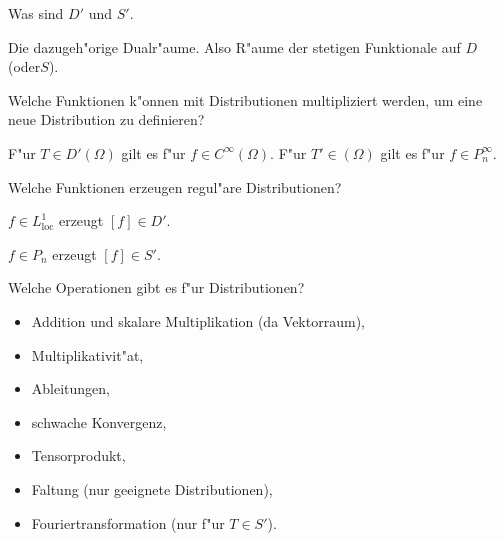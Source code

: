 \documentclass[9pt]{article}
\newenvironment{field}{}{\newpage}
\newif\ifnote
\newenvironment{note}{\notetrue}{\notefalse}
\newcommand{\localtag}{}
\newcommand{\globaltag}{}
\newcommand{\uuid}{}
\newcommand{\tags}[1]{
    \ifnote 
        \renewcommand{\localtag}{#1}
    \else
        \renewcommand{\globaltag}{#1}
    \fi 
    }
\newcommand{\xplain}[1]{\renewcommand{\uuid}{#1}}
\begin{document}
				\begin{note}
					\xplain{9d3022eb-bcb3-4ebd-9d9a-e47e352b6adc}
					\tags{}
					
					\begin{field}  %
						Was sind $D'$ und $S'$.
					\end{field}
					
					\begin{field}  %
						Die dazugeh"orige Dualr"aume. Also R"aume der stetigen Funktionale auf $D$ (oder$S$).
					\end{field}
						
					\begin{field}  %
						Welche Funktionen k"onnen mit Distributionen multipliziert werden, um eine
						neue Distribution zu definieren?
					\end{field}
					
					\begin{field}  %
						F"ur $T\in D'(\Omega)$ gilt es f"ur  $f\in C^\infty(\Omega)$.
						F"ur $T'\in (\Omega)$ gilt es f"ur  $f\in P^\infty_n$.
					\end{field}
						
					\begin{field}  %
						Welche Funktionen erzeugen regul"are Distributionen? 
					\end{field}
					
					\begin{field}  %
						$f\in L^1_{\text{loc}}$ erzeugt $[f]\in D'$.
						
						$f \in P_n$ erzeugt $[f] \in S'$.
					\end{field}
						
					\begin{field}  %
						Welche Operationen gibt es f"ur Distributionen?
					\end{field}
					
					\begin{field}  %
						\begin{itemize}
							\item Addition und skalare Multiplikation (da Vektorraum),
							\item Multiplikativit"at,
							\item Ableitungen,
							\item schwache Konvergenz,
							\item Tensorprodukt,
							\item Faltung (nur geeignete Distributionen),
							\item Fouriertransformation (nur f"ur $T\in S'$).
						\end{itemize}
					\end{field}
						

\end{note}
\end{document}
